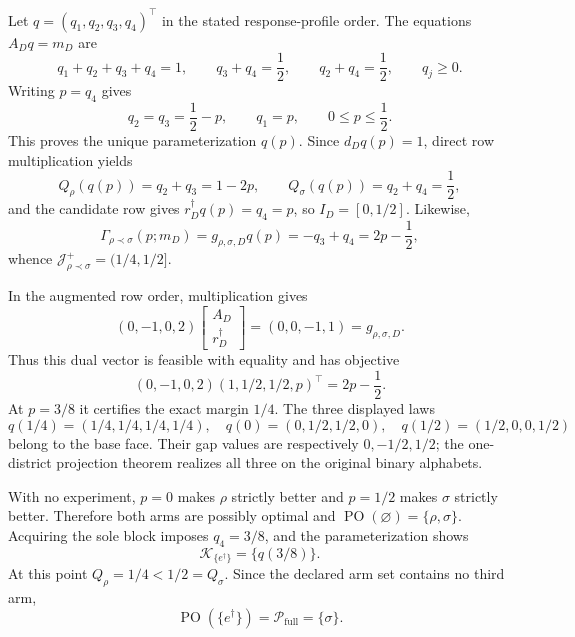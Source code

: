 Let \(q=(q_1,q_2,q_3,q_4)^\top\) in the stated response-profile order.  The equations \(A_Dq=m_D\) are
\[
 q_1+q_2+q_3+q_4=1,
 \qquad q_3+q_4=\frac12,
 \qquad q_2+q_4=\frac12,
 \qquad q_j\geq0.
\]
Writing \(p=q_4\) gives
\[
 q_2=q_3=\frac12-p,
 \qquad q_1=p,
 \qquad 0\leq p\leq\frac12.
\]
This proves the unique parameterization \(q(p)\).  Since \(d_Dq(p)=1\), direct row multiplication yields
\[
 Q_\rho(q(p))=q_2+q_3=1-2p,
 \qquad Q_\sigma(q(p))=q_2+q_4=\frac12,
\]
and the candidate row gives \(r_D^\dagger q(p)=q_4=p\), so \(I_D=[0,1/2]\).  Likewise,
\[
 \Gamma_{\rho\prec\sigma}(p;m_D)=g_{\rho,\sigma,D}q(p)
 =-q_3+q_4=2p-\frac12,
\]
whence \(\mathcal J_{\rho\prec\sigma}^+=(1/4,1/2]\).

In the augmented row order, multiplication gives
\[
 (0,-1,0,2)
 \begin{bmatrix}A_D\\ r_D^\dagger\end{bmatrix}
 =(0,0,-1,1)=g_{\rho,\sigma,D}.
\]
Thus this dual vector is feasible with equality and has objective
\[
 (0,-1,0,2)(1,1/2,1/2,p)^\top=2p-\frac12.
\]
At \(p=3/8\) it certifies the exact margin \(1/4\).  The three displayed laws
\[
 q(1/4)=(1/4,1/4,1/4,1/4),\quad
 q(0)=(0,1/2,1/2,0),\quad
 q(1/2)=(1/2,0,0,1/2)
\]
belong to the base face.  Their gap values are respectively \(0,-1/2,1/2\); the one-district projection theorem realizes all three on the original binary alphabets.

With no experiment, \(p=0\) makes \(\rho\) strictly better and \(p=1/2\) makes \(\sigma\) strictly better.  Therefore both arms are possibly optimal and
\(
 \operatorname{PO}(\varnothing)=\{\rho,\sigma\}.
\)
Acquiring the sole block imposes \(q_4=3/8\), and the parameterization shows
\[
 \mathcal K_{\{e^\dagger\}}=\{q(3/8)\}.
\]
At this point \(Q_\rho=1/4<1/2=Q_\sigma\).  Since the declared arm set contains no third arm,
\[
 \operatorname{PO}(\{e^\dagger\})
 =\mathcal P_{\mathrm{full}}
 =\{\sigma\}.
\]